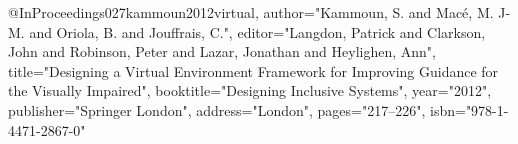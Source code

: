 @InProceedings{027kammoun2012virtual,
author="Kammoun, S.
and Mac{\'e}, M. J-M.
and Oriola, B.
and Jouffrais, C.",
editor="Langdon, Patrick
and Clarkson, John
and Robinson, Peter
and Lazar, Jonathan
and Heylighen, Ann",
title="Designing a Virtual Environment Framework for Improving Guidance for the Visually Impaired",
booktitle="Designing Inclusive Systems",
year="2012",
publisher="Springer London",
address="London",
pages="217--226",
isbn="978-1-4471-2867-0"
}